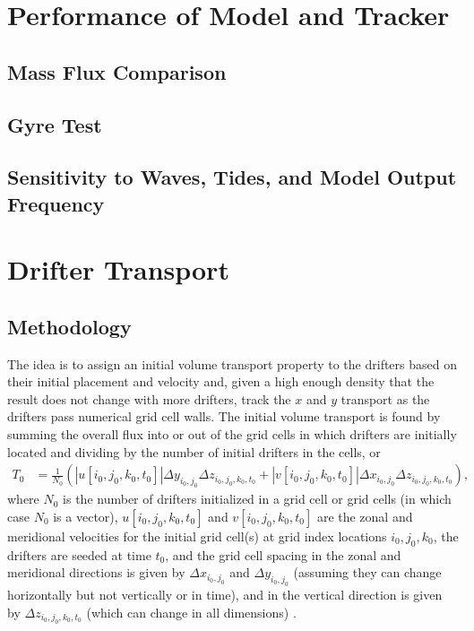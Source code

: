 \documentclass[11pt]{article}
\begin{document}
\section{Performance of Model and Tracker}

\subsection{Mass Flux Comparison}

\subsection{Gyre Test}

\subsection{Sensitivity to Waves, Tides, and Model Output Frequency}


\section{Drifter Transport} \label{sec:transport}

\subsection{Methodology}

The idea is to assign an initial volume transport property to the drifters based on their initial placement and velocity and, given a high enough density that the result does not change with more drifters, track the $x$ and $y$ transport as the drifters pass numerical grid cell walls. The initial volume transport is found by summing the overall flux into or out of the grid cells in which drifters are initially located and dividing by the number of initial drifters in the cells, or
\begin{align*}
    T_0 &= \frac{1}{N_0} \left(\left|u[i_0,j_0,k_0,t_0]\right| \Delta y_{i_0,j_0} \Delta z_{i_0,j_0,k_0,t_0} + \left|v[i_0,j_0,k_0,t_0]\right| \Delta x_{i_0,j_0} \Delta z_{i_0,j_0,k_0,t_0}\right),
\end{align*}
where $N_0$ is the number of drifters initialized in a grid cell or grid cells (in which case $N_0$ is a vector), $u[i_0,j_0,k_0,t_0]$ and $v[i_0,j_0,k_0,t_0]$ are the zonal and meridional velocities for the initial grid cell(s) at grid index locations $i_0,j_0,k_0$, the drifters are seeded at time $t_0$, and the grid cell spacing in the zonal and meridional directions is given by $\Delta x_{i_0,j_0}$ and $\Delta y_{i_0,j_0}$ (assuming they can change horizontally but not vertically or in time), and in the vertical direction is given by $\Delta z_{i_0,j_0,k_0,t_0}$ (which can change in all dimensions) \citep{Doos:1995tf}.
\end{document}
